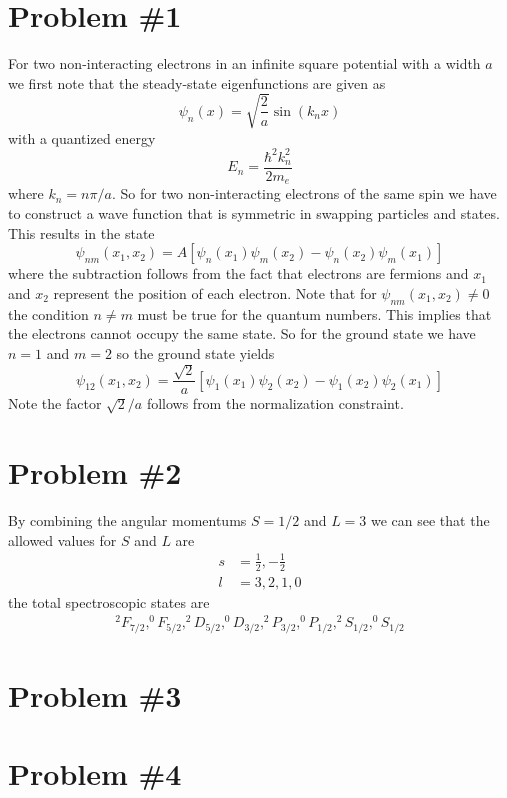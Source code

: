 \documentclass[11pt]{article}
\numberwithin{equation}{section}
\begin{document}


\section{Problem \#1}
For two non-interacting electrons in an infinite square potential with a width $a$ we first note that the steady-state eigenfunctions are given as
$$\psi_n(x) = \sqrt{\frac{2}{a}}\sin(k_n x)$$
with a quantized energy
$$E_n = \frac{\hbar^2k_n^2}{2m_e}$$
where $k_n = n\pi/a$. So for two non-interacting electrons of the same spin we have to construct a wave function that is symmetric in swapping particles and states. This results in the state
$$\psi_{nm}(x_1,x_2) = A[\psi_n(x_1)\psi_m(x_2) - \psi_n(x_2)\psi_m(x_1)]$$
where the subtraction follows from the fact that electrons are fermions and $x_1$ and $x_2$ represent the position of each electron. Note that for $\psi_{nm}(x_1,x_2)\ne0$ the condition $n\ne m$ must be true for the quantum numbers. This implies that the electrons cannot occupy the same state. So for the ground state we have $n=1$ and $m=2$ so the ground state yields
$$\psi_{12}(x_1,x_2) = \frac{\sqrt{2}}{a}\left[\psi_1(x_1)\psi_2(x_2) - \psi_1(x_2)\psi_2(x_1)\right]$$
Note the factor $\sqrt{2}/a$ follows from the normalization constraint.

\section{Problem \#2}
By combining the angular momentums $S = 1/2$ and $L = 3$ we can see that the allowed values for $S$ and $L$ are
\begin{align*}
s &= \frac{1}{2}, -\frac{1}{2}\\
l &= 3,2,1,0
\end{align*}
the total spectroscopic states are
\begin{align*}
^2F_{7/2}, ^0F_{5/2}, ^2D_{5/2}, ^0D_{3/2}, ^2P_{3/2}, ^0P_{1/2}, ^2S_{1/2}, ^0S_{1/2}
\end{align*}


\section{Problem \#3}

\section{Problem \#4}
\end{document}
